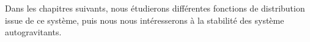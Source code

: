 Dans les chapitres suivants, nous étudierons différentes fonctions de distribution issue de ce système, puis nous nous intéresserons à la stabilité
des système autogravitants.






